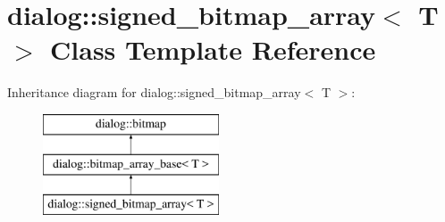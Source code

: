 \hypertarget{classdialog_1_1signed__bitmap__array}{}\section{dialog\+:\+:signed\+\_\+bitmap\+\_\+array$<$ T $>$ Class Template Reference}
\label{classdialog_1_1signed__bitmap__array}
Inheritance diagram for dialog\+:\+:signed\+\_\+bitmap\+\_\+array$<$ T $>$\+:\begin{figure}[H]
\begin{center}
\leavevmode
\includegraphics[height=3.000000cm]{classdialog_1_1signed__bitmap__array}
\end{center}
\end{figure}
